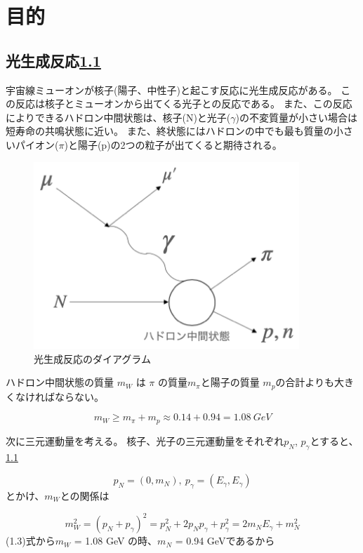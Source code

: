 \chapter{目的} \label{cha:introduction}

\section{光生成反応\ref{fig:test1}}

宇宙線ミューオンが核子(陽子、中性子)と起こす反応に光生成反応がある。
この反応は核子とミューオンから出てくる光子との反応である。
また、この反応によりできるハドロン中間状態は、核子(N)と光子($\gamma$)の不変質量が小さい場合は短寿命の共鳴状態に近い。
また、終状態にはハドロンの中でも最も質量の小さいパイオン($\pi$)と陽子(p)の2つの粒子が出てくると期待される。

\begin{figure}[H]
	\centering
	\includegraphics[width=10cm]{img/diagram_photoproduction.png}
	\caption{光生成反応のダイアグラム}
	\label{fig:test1}
\end{figure}

ハドロン中間状態の質量 $m_W$ は $\pi$ の質量$m_\pi$と陽子の質量 $m_p$の合計よりも大きくなければならない。

\begin{equation}
    m_W \geq m_\pi + m_p \approx 0.14 + 0.94 = 1.08 \ GeV
\end{equation}

次に三元運動量を考える。
核子、光子の三元運動量をそれぞれ$p_N$, $p_\gamma$とすると、\ref{fig:test1}

\begin{equation}
    p_N = (0, m_N),\  p_\gamma = (E_\gamma, E_\gamma)
\end{equation}
とかけ、$m_W$との関係は

\begin{equation}
    m_W^2 = (p_N + p_\gamma)^2 = p_N^2 + 2p_N p_\gamma + p_\gamma^2
          = 2m_N E_\gamma + m_N^2 
\end{equation}
(1.3)式から$m_W$ = 1.08 GeV の時、$m_N$ = 0.94 GeVであるから

